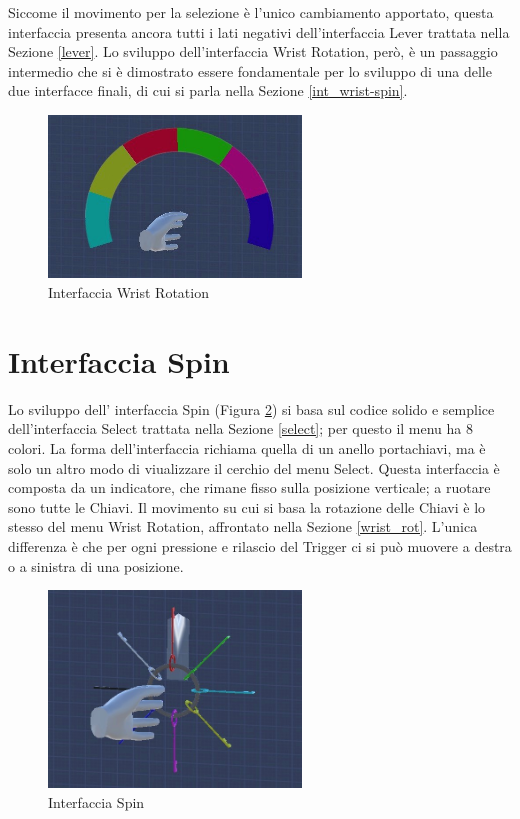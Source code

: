 \documentclass[target=bach,aauheader=]{thud}
\begin{document}
Siccome il movimento per la selezione è l'unico cambiamento apportato, questa interfaccia presenta ancora tutti i lati negativi dell'interfaccia Lever trattata nella Sezione \ref{lever}.
Lo sviluppo dell'interfaccia Wrist Rotation, però, è un passaggio intermedio che si è dimostrato essere fondamentale per lo sviluppo di una delle due interfacce finali, di cui si parla nella Sezione \ref{int_wrist-spin}.

\begin{figure}[h]
    \centering
    \includegraphics[width=0.60\textwidth]{wrist_rot}
    \caption{Interfaccia Wrist Rotation}
    \label{fig:wrist_rot}
\end{figure}

\section{Interfaccia Spin} %
\label{spin}
Lo sviluppo dell' interfaccia Spin (Figura \ref{fig:spin}) si basa sul codice solido e semplice dell'interfaccia Select trattata nella Sezione \ref{select}; per questo il menu ha 8 colori.
La forma dell'interfaccia richiama quella di un anello portachiavi, ma è solo un altro modo di viualizzare il cerchio del menu Select.
Questa interfaccia è composta da un indicatore, che rimane fisso sulla posizione verticale; a ruotare sono tutte le Chiavi.
Il movimento su cui si basa la rotazione delle Chiavi è lo stesso del menu Wrist Rotation, affrontato nella Sezione \ref{wrist_rot}.
L'unica differenza è che per ogni pressione e rilascio del Trigger ci si può muovere a destra o a sinistra di una posizione. \\

\begin{figure}[h]
    \centering
    \includegraphics[width=0.60\textwidth]{spin}
    \caption{Interfaccia Spin}
    \label{fig:spin}
\end{figure}
\end{document}
